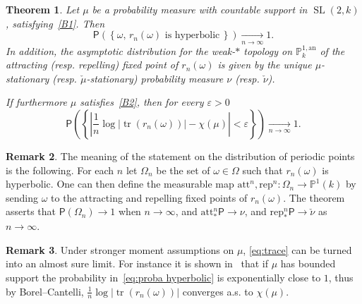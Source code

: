 \documentclass[10pt]{amsart}
\newtheorem{theo}{Theorem}[section]
\theoremstyle{definition}\newtheorem{defi}[theo]{Definition}\newtheorem{rema}[theo]{Remark}\newtheorem{exam}[theo]{Example}\newtheorem{exem}[theo]{Example}\newtheorem{nota}[theo]{Notation}
\DeclareMathOperator{\tr}{tr}
\DeclareMathOperator{\SL}{SL}
\newcommand{\prob}{\mathsf{P}}
\newcommand{\Rep}{\mathrm{rep}}
\newcommand{\Att}{\mathrm{att}}
\newcommand{\e}{\varepsilon}
\newcommand{\cv}{\rightarrow}
\newcommand{\set}[1]{\left\{#1\right\}}
\newcommand{\abs}[1]{\left\vert#1\right\vert}
\newcommand{\PP}{\mathbb{P}}
\newcommand{\berk}{{\mathbb{P}^{1, \mathrm{an}}_k}}
\newcommand{\unsur}[1]{\frac{1}{#1}}
\newcommand{\lrpar}[1]{\left(#1\right)}
\newcommand{\SLk}{\SL(2,k)}
\begin{document}
\begin{theo}\label{thm:loxodromic}
Let $\mu$ be a probability measure with countable support in $\SLk$, satisfying~\eqref{B1}. Then
\begin{equation}\label{eq:proba hyperbolic}
\prob\lrpar{\left\{ \omega, \, r_n(\omega)
\text{ is hyperbolic}\, \right\}}
\underset {n\cv\infty}\longrightarrow 1.
\end{equation}
In addition, the asymptotic distribution for the weak-$\ast$ topology on $\berk$ of the attracting (resp. repelling) fixed point of $r_n(\omega)$ is given by the unique $\mu$-stationary (resp. $\check{\mu}$-stationary) probability measure $\nu$ (resp. $\check{\nu}$).

If furthermore $\mu$ satisfies~\eqref{B2}, then for every $\e>0$
\begin{equation}\label{eq:trace}
\prob\lrpar{\set{
\abs{ \unsur{n}\log\abs{\tr (r_n(\omega))} - \chi(\mu)} <\e }} \underset {n\cv\infty}\longrightarrow 1.
\end{equation}
\end{theo}

\begin{rema}\label{rem:301}
The meaning of the statement on the distribution of periodic points is the following. For each $n$ let $\Omega_n$ be the set of $\omega\in \Omega$ such that $r_n(\omega)$ is hyperbolic. One can then define the measurable map $\Att^n, \Rep^n: \Omega_n \to \PP^1(k)$ by sending $\omega$ to the attracting and repelling fixed points of $r_n(\omega)$. The theorem asserts that $\prob(\Omega_n) \to1$ when $n\to\infty$, and $\Att^n_* \prob \to \nu$, and $\Rep^n_* \prob \to \check{\nu}$ as $n\to\infty$.
\end{rema}

\begin{rema}\label{rem:302}
Under stronger moment assumptions on $\mu$, \eqref{eq:trace} can be turned
into an almost sure limit. For instance it is shown in~\cite[Thm.~1.4]{maher-tiozzo} that if $\mu$ has bounded support the probability in~\eqref{eq:proba hyperbolic} is exponentially close to $1$, thus by Borel--Cantelli, $\unsur{n}\log\abs{\tr (r_n(\omega))}$ converges a.s. to $\chi(\mu)$.
\end{rema}
\end{document}
